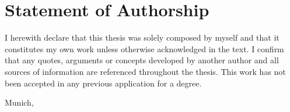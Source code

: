 \makeatletter

\chapter*{Statement of Authorship}

I herewith declare that this thesis was solely composed by myself and that it constitutes my own work unless otherwise acknowledged in the text. I confirm that any quotes, arguments or concepts developed by another author and all sources of information are referenced throughout the thesis. This work has not been accepted in any previous application for a degree.

\vspace{1cm}

\par\noindent%
Munich, \@date \hfill\makebox[2.0in]{\hrulefill}%
\vspace{-\parskip}\par\noindent%
\hfill{}

\makeatother
